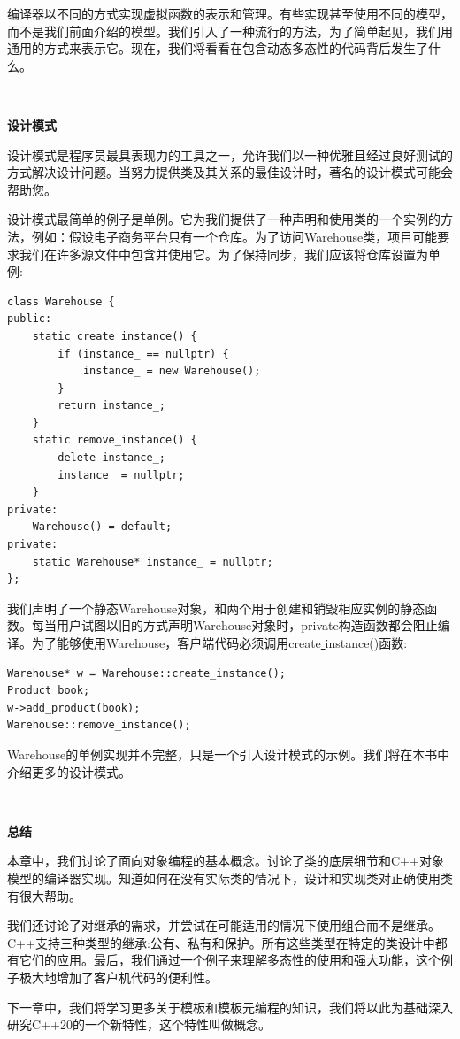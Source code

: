 编译器以不同的方式实现虚拟函数的表示和管理。有些实现甚至使用不同的模型，而不是我们前面介绍的模型。我们引入了一种流行的方法，为了简单起见，我们用通用的方式来表示它。现在，我们将看看在包含动态多态性的代码背后发生了什么。\par

\noindent\textbf{}\ \par
\textbf{设计模式} \ \par
设计模式是程序员最具表现力的工具之一，允许我们以一种优雅且经过良好测试的方式解决设计问题。当努力提供类及其关系的最佳设计时，著名的设计模式可能会帮助您。 \par
设计模式最简单的例子是单例。它为我们提供了一种声明和使用类的一个实例的方法，例如：假设电子商务平台只有一个仓库。为了访问Warehouse类，项目可能要求我们在许多源文件中包含并使用它。为了保持同步，我们应该将仓库设置为单例: \par

\begin{lstlisting}[caption={}]
class Warehouse {
public:
	static create_instance() {
		if (instance_ == nullptr) {
			instance_ = new Warehouse();
		}
		return instance_;
	}
	static remove_instance() {
		delete instance_;
		instance_ = nullptr;
	}
private:
	Warehouse() = default;
private:
	static Warehouse* instance_ = nullptr;
};
\end{lstlisting}

我们声明了一个静态Warehouse对象，和两个用于创建和销毁相应实例的静态函数。每当用户试图以旧的方式声明Warehouse对象时，private构造函数都会阻止编译。为了能够使用Warehouse，客户端代码必须调用create\underline{ }instance()函数: \par

\begin{lstlisting}[caption={}]
Warehouse* w = Warehouse::create_instance();
Product book;
w->add_product(book);
Warehouse::remove_instance();
\end{lstlisting}

Warehouse的单例实现并不完整，只是一个引入设计模式的示例。我们将在本书中介绍更多的设计模式。\par

\noindent\textbf{}\ \par
\textbf{总结} \ \par
本章中，我们讨论了面向对象编程的基本概念。讨论了类的底层细节和C++对象模型的编译器实现。知道如何在没有实际类的情况下，设计和实现类对正确使用类有很大帮助。\par
我们还讨论了对继承的需求，并尝试在可能适用的情况下使用组合而不是继承。C++支持三种类型的继承:公有、私有和保护。所有这些类型在特定的类设计中都有它们的应用。最后，我们通过一个例子来理解多态性的使用和强大功能，这个例子极大地增加了客户机代码的便利性。 \par
下一章中，我们将学习更多关于模板和模板元编程的知识，我们将以此为基础深入研究C++20的一个新特性，这个特性叫做概念。 \par

